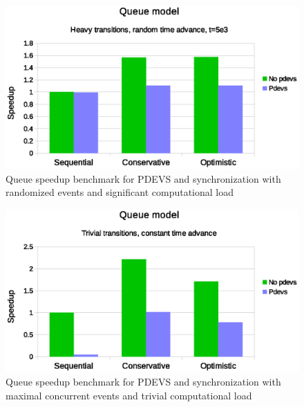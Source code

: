 \begin{figure}
	\center
	\includegraphics[width=\columnwidth]{fig/pdevs_random_sleep.eps}
	\caption{Queue speedup benchmark for PDEVS and synchronization with randomized events and significant computational load}
	\label{fig:pdevs_plot_random_sleep}
\end{figure}

\begin{figure}
	\center
	\includegraphics[width=\columnwidth]{fig/pdevs_no_sleep.eps}
	\caption{Queue speedup benchmark for PDEVS and synchronization with maximal concurrent events and trivial computational load}
	\label{fig:pdevs_plot_no_sleep}
\end{figure} 